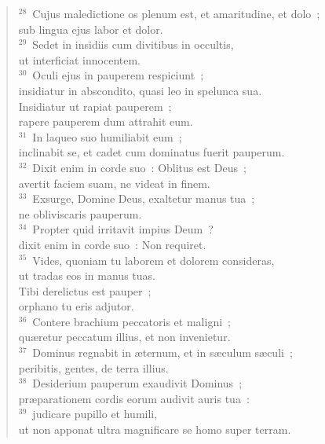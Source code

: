\begin{flushleft}
\begin{verse}
${}^{28}$~Cujus maledictione os plenum est, et amaritudine, et dolo~;\\ sub lingua ejus labor et dolor.\\
${}^{29}$~Sedet in insidiis cum divitibus in occultis,\\ ut interficiat innocentem.\\
${}^{30}$~Oculi ejus in pauperem respiciunt~;\\ insidiatur in abscondito, quasi leo in spelunca sua.\\ Insidiatur ut rapiat pauperem~;\\ rapere pauperem dum attrahit eum.\\
${}^{31}$~In laqueo suo humiliabit eum~;\\ inclinabit se, et cadet cum dominatus fuerit pauperum.\\
${}^{32}$~Dixit enim in corde suo~: Oblitus est Deus~;\\ avertit faciem suam, ne videat in finem.\\
${}^{33}$~Exsurge, Domine Deus, exaltetur manus tua~;\\ ne obliviscaris pauperum.\\
${}^{34}$~Propter quid irritavit impius Deum~?\\ dixit enim in corde suo~: Non requiret.\\
${}^{35}$~Vides, quoniam tu laborem et dolorem consideras,\\ ut tradas eos in manus tuas.\\ Tibi derelictus est pauper~;\\ orphano tu eris adjutor.\\
${}^{36}$~Contere brachium peccatoris et maligni~;\\ qu\ae retur peccatum illius, et non invenietur.\\
${}^{37}$~Dominus regnabit in \ae ternum, et in s\ae culum s\ae culi~;\\ peribitis, gentes, de terra illius.\\
${}^{38}$~Desiderium pauperum exaudivit Dominus~;\\ pr\ae parationem cordis eorum audivit auris tua~:\\
${}^{39}$~judicare pupillo et humili,\\ ut non apponat ultra magnificare se homo super terram.\end{verse}\end{flushleft}



